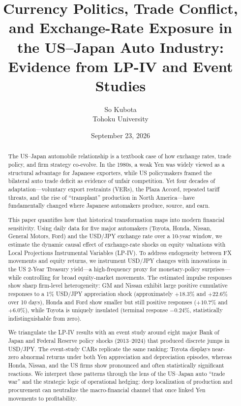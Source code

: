 \documentclass[12pt,a4paper]{article}
\title{Currency Politics, Trade Conflict, and Exchange-Rate Exposure in the US--Japan Auto Industry: Evidence from LP-IV and Event Studies}
\author{So Kubota\\Tohoku University}
\date{September 23, 2026}
\begin{document}
\maketitle

\begin{abstract}
The US--Japan automobile relationship is a textbook case of how exchange rates, trade policy, and firm strategy co-evolve. In the 1980s, a weak Yen was widely viewed as a structural advantage for Japanese exporters, while US policymakers framed the bilateral auto trade deficit as evidence of unfair competition. Yet four decades of adaptation---voluntary export restraints (VERs), the Plaza Accord, repeated tariff threats, and the rise of ``transplant'' production in North America---have fundamentally changed where Japanese automakers produce, source, and earn.

This paper quantifies how that historical transformation maps into modern financial sensitivity. Using daily data for five major automakers (Toyota, Honda, Nissan, General Motors, Ford) and the USD/JPY exchange rate over a 10-year window, we estimate the dynamic causal effect of exchange-rate shocks on equity valuations with Local Projections Instrumental Variables (LP-IV). To address endogeneity between FX movements and equity returns, we instrument USD/JPY changes with innovations in the US 2-Year Treasury yield---a high-frequency proxy for monetary-policy surprises---while controlling for broad equity-market movements. The estimated impulse responses show sharp firm-level heterogeneity: GM and Nissan exhibit large positive cumulative responses to a 1\% USD/JPY appreciation shock (approximately $+18.3\%$ and $+22.6\%$ over 10 days), Honda and Ford show smaller but still positive responses ($+10.7\%$ and $+6.0\%$), while Toyota is uniquely insulated (terminal response $-0.24\%$, statistically indistinguishable from zero).

We triangulate the LP-IV results with an event study around eight major Bank of Japan and Federal Reserve policy shocks (2013--2024) that produced discrete jumps in USD/JPY. The event-study CARs replicate the same ranking: Toyota displays near-zero abnormal returns under both Yen appreciation and depreciation episodes, whereas Honda, Nissan, and the US firms show pronounced and often statistically significant reactions. We interpret these patterns through the lens of the US--Japan auto ``trade war'' and the strategic logic of operational hedging: deep localization of production and procurement can neutralize the macro-financial channel that once linked Yen movements to profitability.
\end{abstract}
\end{document}
